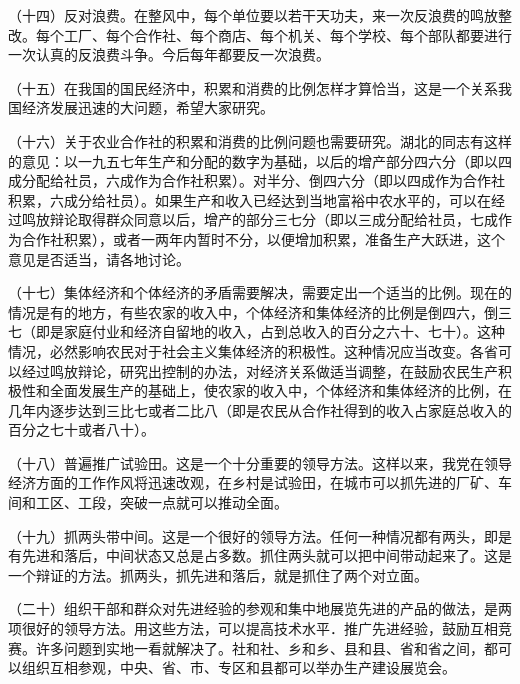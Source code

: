 （十四）反对浪费。在整风中，每个单位要以若干天功夫，来一次反浪费的鸣放整改。每个工厂、每个合作社、每个商店、每个机关、每个学校、每个部队都要进行一次认真的反浪费斗争。今后每年都要反一次浪费。

（十五）在我国的国民经济中，积累和消费的比例怎样才算恰当，这是一个关系我国经济发展迅速的大问题，希望大家研究。

（十六）关于农业合作社的积累和消费的比例问题也需要研究。湖北的同志有这样的意见：以一九五七年生产和分配的数字为基础，以后的增产部分四六分（即以四成分配给社员，六成作为合作社积累）。对半分、倒四六分（即以四成作为合作社积累，六成分给社员）。如果生产和收入已经达到当地富裕中农水平的，可以在经过鸣放辩论取得群众同意以后，增产的部分三七分（即以三成分配给社员，七成作为合作社积累），或者一两年内暂时不分，以便增加积累，准备生产大跃进，这个意见是否适当，请各地讨论。


（十七）集体经济和个体经济的矛盾需要解决，需要定出一个适当的比例。现在的情况是有的地方，有些农家的收入中，个体经济和集体经济的比例是倒四六，倒三七（即是家庭付业和经济自留地的收入，占到总收入的百分之六十、七十）。这种情况，必然影响农民对于社会主义集体经济的积极性。这种情况应当改变。各省可以经过鸣放辩论，研究出控制的办法，对经济关系做适当调整，在鼓励农民生产积极性和全面发展生产的基础上，使农家的收入中，个体经济和集体经济的比例，在几年内逐步达到三比七或者二比八（即是农民从合作社得到的收入占家庭总收入的百分之七十或者八十）。

（十八）普遍推广试验田。这是一个十分重要的领导方法。这样以来，我党在领导经济方面的工作作风将迅速改观，在乡村是试验田，在城市可以抓先进的厂矿、车间和工区、工段，突破一点就可以推动全面。

（十九）抓两头带中间。这是一个很好的领导方法。任何一种情况都有两头，即是有先进和落后，中间状态又总是占多数。抓住两头就可以把中间带动起来了。这是一个辩证的方法。抓两头，抓先进和落后，就是抓住了两个对立面。

（二十）组织干部和群众对先进经验的参观和集中地展览先进的产品的做法，是两项很好的领导方法。用这些方法，可以提高技术水平．推广先进经验，鼓励互相竞赛。许多问题到实地一看就解决了。社和社、乡和乡、县和县、省和省之间，都可以组织互相参观，中央、省、市、专区和县都可以举办生产建设展览会。

